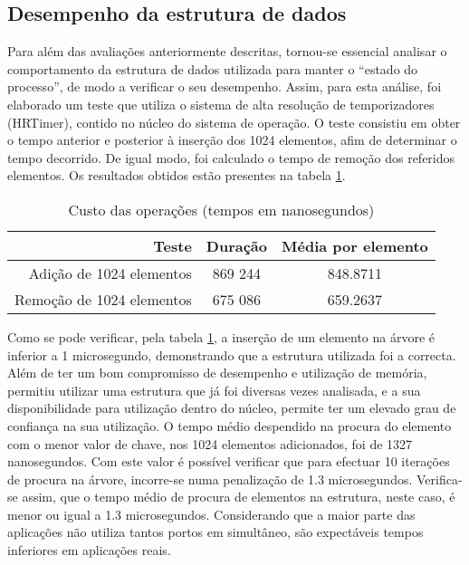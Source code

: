 \subsection{Desempenho da estrutura de dados}

Para além das avaliações anteriormente descritas, tornou-se essencial analisar o comportamento da estrutura de dados utilizada para manter o “estado do processo”, de modo a verificar o seu desempenho.
Assim, para esta análise, foi elaborado um teste que utiliza o sistema de alta resolução de temporizadores (HRTimer), contido no núcleo do sistema de operação. O teste consistiu em obter o tempo anterior e posterior à inserção dos 1024 elementos, afim de determinar o tempo decorrido.
De igual modo, foi calculado o tempo de remoção dos referidos elementos. Os resultados obtidos estão presentes na tabela \ref{tab:tree_info}.

\begin{table}[!htb]
\begin{center}
\caption{Custo das operações (tempos em nanosegundos)}
\begin{tabular}{ | r | c | c | }
\hline
\hspace{1cm} Teste \hspace{1.5cm} & \hspace{1cm}Duração\hspace{1cm} &  Média por
elemento \\
\hline
Adição de 1024 elementos & 869 244 & 848.8711 \\
\hline
Remoção de 1024 elementos & 675 086 & 659.2637\\
\hline

\hline
\end{tabular}
\label{tab:tree_info}
\end{center}
\end{table}

Como se pode verificar, pela tabela \ref{tab:tree_info}, a inserção de um elemento na árvore é inferior a 1 microsegundo, demonstrando que a estrutura utilizada foi a correcta.
Além de ter um bom compromisso de desempenho e utilização de memória, permitiu utilizar uma estrutura que já foi diversas vezes analisada, e a sua disponibilidade para utilização dentro do núcleo, permite ter um elevado grau de confiança na sua utilização.
O tempo médio despendido na procura do elemento com o menor valor de chave, nos 1024 elementos adicionados, foi de 1327 nanosegundos.
Com este valor é possível verificar que para efectuar 10 iterações de procura na árvore, incorre-se numa penalização de 1.3 microsegundos.
Verifica-se assim, que o tempo médio de procura de elementos na estrutura, neste caso, é menor ou igual a 1.3 microsegundos.
Considerando que a maior parte das aplicações não utiliza tantos portos em simultâneo, são expectáveis tempos inferiores em aplicações reais.


